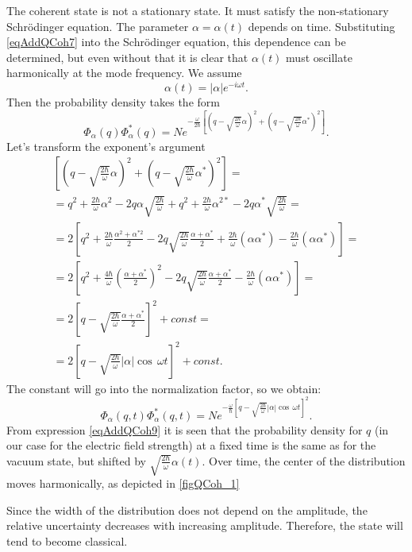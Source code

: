 The coherent state is not a stationary state. It must satisfy the non-stationary Schrödinger equation. The parameter $\alpha = \alpha\left(t\right)$ depends on time. Substituting \eqref{eqAddQCoh7} into the Schrödinger equation, this dependence can be determined, but even without that it is clear that $\alpha\left(t\right)$ must oscillate harmonically at the mode frequency. We assume 
\[
\alpha\left(t\right) = \left|\alpha\right| e^{-i \omega t}.
\]
Then the probability density takes the form
\begin{equation}
\Phi_{\alpha}\left(q\right)\Phi_{\alpha}^{*}\left(q\right) = N e^{-\frac{\omega}{2
    \hbar}
\left[\left(q-\sqrt{\frac{2\hbar}{\omega}}\alpha\right)^2
+
\left(q-\sqrt{\frac{2\hbar}{\omega}}\alpha^{*}\right)^2
\right]
}.
\nonumber
\end{equation}
Let's transform the exponent's argument
\begin{eqnarray}
\left[\left(q-\sqrt{\frac{2\hbar}{\omega}}\alpha\right)^2
+
\left(q-\sqrt{\frac{2\hbar}{\omega}}\alpha^{*}\right)^2
\right] = 
\nonumber \\
=
q^2 + \frac{2\hbar}{\omega}\alpha^2 - 2 q \alpha
  \sqrt{\frac{2\hbar}{\omega}} +
q^2 + \frac{2\hbar}{\omega}\alpha^{2 *} - 2 q \alpha^{*}
  \sqrt{\frac{2\hbar}{\omega}} =
\nonumber \\
= 2
\left[
q^2 + \frac{2\hbar}{\omega}\frac{\alpha^2 + \alpha^{*2}}{2} -
2 q \sqrt{\frac{2\hbar}{\omega}} \frac{\alpha + \alpha^{*}}{2} +
\frac{2 \hbar}{\omega}\left(\alpha\alpha^{*}\right) -
\frac{2 \hbar}{\omega}\left(\alpha\alpha^{*}\right)
\right] = 
\nonumber \\
= 2
\left[
q^2 + \frac{4\hbar}{\omega}\left(\frac{\alpha + \alpha^{*}}{2}\right)^2 -
2 q \sqrt{\frac{2\hbar}{\omega}} \frac{\alpha + \alpha^{*}}{2}  -
\frac{2 \hbar}{\omega}\left(\alpha\alpha^{*}\right)
\right] = 
\nonumber \\
= 2
\left[
q - \sqrt{\frac{2\hbar}{\omega}} \frac{\alpha + \alpha^{*}}{2}
\right]^2 + const = 
\nonumber \\
= 
2
\left[
q - \sqrt{\frac{2\hbar}{\omega}} \left|\alpha\right|\cos\,\omega t
\right]^2 + const.
\nonumber
\end{eqnarray}
The constant will go into the normalization factor, so we obtain:
\begin{equation}
\Phi_{\alpha}\left(q,t\right)\Phi_{\alpha}^{*}\left(q,t\right) = N
e^{-\frac{\omega}{\hbar}
\left[
q - \sqrt{\frac{2\hbar}{\omega}} \left|\alpha\right|\cos\,\omega t
\right]^2
}.
\label{eqAddQCoh9}
\end{equation}
From expression \eqref{eqAddQCoh9} it is seen that the probability density for
$q$ (in our case for the electric field strength) at a fixed time is the same as for the vacuum state, but shifted by 
$\sqrt{\frac{2\hbar}{\omega}}\alpha\left(t\right)$. Over time, the center
of the distribution moves harmonically, as depicted in \autoref{figQCoh_1} 



Since the width of the distribution does not depend on the amplitude, the relative
uncertainty decreases with increasing amplitude. Therefore, the state will tend to become classical.